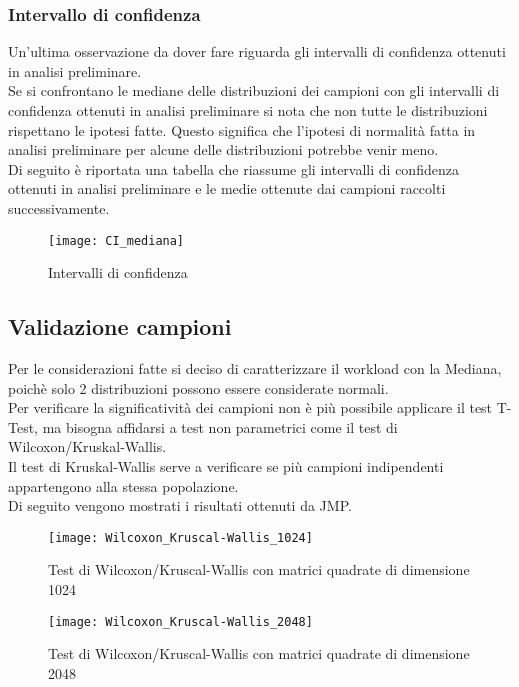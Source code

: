 \subsubsection{Intervallo di confidenza}
Un’ultima osservazione da dover fare riguarda gli intervalli di confidenza ottenuti in
analisi preliminare.\\
Se si confrontano le mediane delle distribuzioni dei campioni
con gli intervalli di confidenza ottenuti in analisi preliminare si nota che non
tutte le distribuzioni rispettano le ipotesi fatte. Questo significa che l’ipotesi
di normalità fatta in analisi preliminare per alcune delle distribuzioni potrebbe venir meno.\\
Di seguito è riportata una tabella che riassume gli intervalli di confidenza
ottenuti in analisi preliminare e le medie ottenute dai campioni raccolti successivamente.

\begin{figure}[!htbp]
  \texttt{[image: CI\_mediana]}
  \caption{Intervalli di confidenza}
  \label{CI_mediana}
\end{figure}
\clearpage
\subsection{Validazione campioni}
Per le considerazioni fatte si deciso di caratterizzare il workload con la Mediana,
poichè solo 2 distribuzioni possono essere considerate normali.\\
Per verificare la significatività dei campioni non è più possibile applicare il test T-Test,
ma bisogna affidarsi a test non parametrici come il test di Wilcoxon/Kruskal-Wallis.\\
Il test di Kruskal-Wallis serve a verificare se più campioni indipendenti appartengono alla
stessa popolazione.\\
Di seguito vengono mostrati i risultati ottenuti da JMP.\\

\begin{figure}[!htbp]
  \texttt{[image: Wilcoxon\_Kruscal-Wallis\_1024]}
  \caption{Test di Wilcoxon/Kruscal-Wallis con matrici quadrate di dimensione 1024}
  \label{Wilcoxon_Kruscal-Wallis_1024}
\end{figure}

\begin{figure}[!htbp]
  \texttt{[image: Wilcoxon\_Kruscal-Wallis\_2048]}
  \caption{Test di Wilcoxon/Kruscal-Wallis con matrici quadrate di dimensione 2048}
  \label{Wilcoxon_Kruscal-Wallis_2048}
\end{figure}

